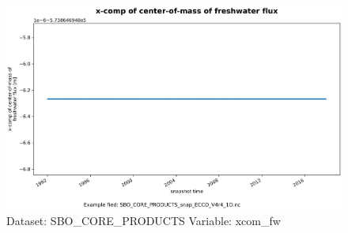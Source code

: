 \begin{figure}[H]
\centering
\includegraphics[scale=0.55]{../images/plots/oneD_plots/SBO_Core_Products/xcom_fw.png}
\caption{Dataset: SBO\_CORE\_PRODUCTS Variable: xcom\_fw}
\label{tab:table-SBO_CORE_PRODUCTS_xcom_fw-Plot}
\end{figure}
\pagebreak
